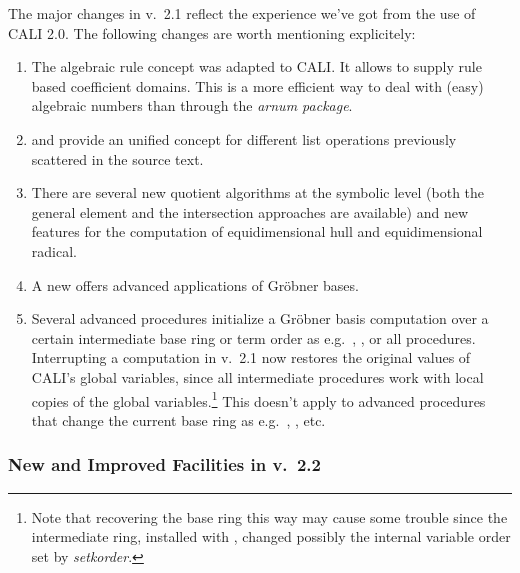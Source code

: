 The major changes in v.\ 2.1 reflect the experience we've got from the
use of CALI 2.0. The following changes are worth mentioning
explicitely:
\begin{enumerate}
\item The algebraic rule concept was adapted to CALI. It allows to
supply rule based coefficient domains. This is a more efficient way
to deal with (easy) algebraic numbers than through the \emph{arnum
package}.

\item {} and  provide an unified
concept for different list operations previously scattered in the
source text.

\item There are several new quotient algorithms at the symbolic level
(both the general element and the intersection approaches are
available) and new features for the computation of equidimensional
hull and equidimensional radical.

\item A new  offers advanced applications of Gr\"obner
bases.

\item Several advanced procedures initialize a Gr\"obner basis computation
over a certain intermediate base ring or term order as e.g.\
, ,  or all
 procedures. Interrupting a computation in
v.\ 2.1 now restores the original values of CALI's global variables,
since all intermediate procedures work with local copies of 
the global variables.\footnote{Note that recovering the base
ring this way may cause some trouble since the intermediate ring,
installed with \ind{setring}, changed possibly the internal variable
order set by \emph{setkorder}.} This doesn't apply to advanced
procedures that change the current base ring as e.g.\ ,
\ind{preimage}, \ind{sym} etc.

\end{enumerate}

\subsubsection{New and Improved Facilities in v.\ 2.2}

